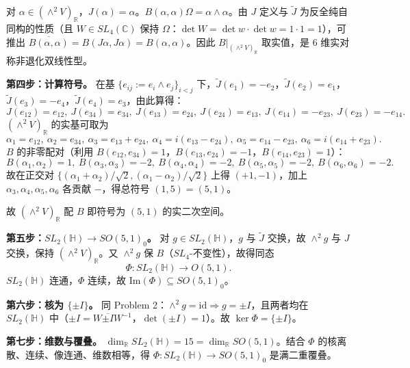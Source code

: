 \documentclass{ctexart}
\begin{document}
对 $\alpha \in (\wedge^{2} V)_{\mathbb{R}}$，$J(\alpha) = \alpha$。$B(\alpha, \alpha) \Omega = \alpha \wedge \alpha$。由 $J$ 定义与 $\tilde{J}$ 为反全纯自同构的性质（且 $W \in SL_4(\mathbb{C})$ 保持 $\Omega$：$\det W = \det w \cdot \det w = 1 \cdot 1 = 1$），可推出 $\overline{B(\alpha,\alpha)} = B(J\alpha, J\alpha) = B(\alpha, \alpha)$。因此 $B|_{(\wedge^2 V)_{\mathbb{R}}}$ 取实值，是 $6$ 维实对称非退化双线性型。

\textbf{第四步：计算符号。} 在基 $\{e_{ij} := e_{i} \wedge e_{j}\}_{i<j}$ 下，$\tilde{J}(e_1) = -e_2$，$\tilde{J}(e_2) = e_1$，$\tilde{J}(e_3) = -e_4$，$\tilde{J}(e_4) = e_3$，由此算得：
\[
J(e_{12}) = e_{12},\ J(e_{34}) = e_{34},\ J(e_{13}) = e_{24},\ J(e_{24}) = e_{13},\ J(e_{14}) = -e_{23},\ J(e_{23}) = -e_{14}.
\]
$(\wedge^{2} V)_{\mathbb{R}}$ 的实基可取为
\[
\alpha_1 = e_{12},\ \alpha_2 = e_{34},\ \alpha_3 = e_{13} + e_{24},\ \alpha_4 = i(e_{13} - e_{24}),\ \alpha_5 = e_{14} - e_{23},\ \alpha_6 = i(e_{14} + e_{23}).
\]
$B$ 的非零配对（利用 $B(e_{12}, e_{34}) = 1$，$B(e_{13}, e_{24}) = -1$，$B(e_{14}, e_{23}) = 1$）：
\[
B(\alpha_1, \alpha_2) = 1,\ B(\alpha_3, \alpha_3) = -2,\ B(\alpha_4, \alpha_4) = -2,\ B(\alpha_5, \alpha_5) = -2,\ B(\alpha_6, \alpha_6) = -2.
\]
故在正交对 $\{(\alpha_1 + \alpha_2)/\sqrt{2}, (\alpha_1 - \alpha_2)/\sqrt{2}\}$ 上得 $(+1, -1)$，加上 $\alpha_3, \alpha_4, \alpha_5, \alpha_6$ 各贡献 $-$，得总符号 $(1, 5) = (5, 1)$。

故 $(\wedge^{2} V)_{\mathbb{R}}$ 配 $B$ 即符号为 $(5, 1)$ 的实二次空间。

\textbf{第五步：$SL_2(\mathbb{H}) \to SO(5,1)_{0}$。} 对 $g \in SL_2(\mathbb{H})$，$g$ 与 $\tilde{J}$ 交换，故 $\wedge^{2} g$ 与 $J$ 交换，保持 $(\wedge^{2} V)_{\mathbb{R}}$。又 $\wedge^{2} g$ 保 $B$（$SL_4$-不变性），故得同态
\[
\Phi: SL_{2}(\mathbb{H}) \longrightarrow O(5,1).
\]
$SL_{2}(\mathbb{H})$ 连通，$\Phi$ 连续，故 $\mathrm{Im}(\Phi) \subseteq SO(5,1)_{0}$。

\textbf{第六步：核为 $\{\pm I\}$。} 同 Problem 2：$\wedge^{2} g = \mathrm{id} \Rightarrow g = \pm I$，且两者均在 $SL_{2}(\mathbb{H})$ 中（$\pm I = W \overline{\pm I} W^{-1}$，$\det(\pm I) = 1$）。故 $\ker \Phi = \{\pm I\}$。

\textbf{第七步：维数与覆叠。} $\dim_{\mathbb{R}} SL_{2}(\mathbb{H}) = 15 = \dim_{\mathbb{R}} SO(5,1)$。结合 $\Phi$ 的核离散、连续、像连通、维数相等，得 $\Phi: SL_2(\mathbb{H}) \to SO(5,1)_{0}$ 是满二重覆叠。
\end{document}
